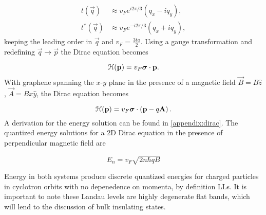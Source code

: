 \begin{align}
  t(\vec{q}) &\approx v_F e^{i 2\pi/3} \left(q_x - iq_y \right), \nonumber \\
  t^*(\vec{q}) &\approx v_F e^{-i 2\pi/3} \left(q_x + iq_y \right), \nonumber
\end{align}
keeping the leading order in $\vec{q}$ and $v_F = \tfrac{3ta}{2}$.
Using a gauge transformation and redefining $\vec{q} \rightarrow \vec{p}$ the Dirac equation becomes

\begin{equation}
  \mathcal{H}(\mathbf{p}) = v_F \bm{\sigma}\cdot \mathbf{p}.
\end{equation}
With graphene spanning the $x$-$y$ plane in the presence of a magnetic field $\vec{B} = B\hat{z}$, $\vec{A} =  Bx\hat{y}$, the Dirac equation becomes

\begin{equation}
  \mathcal{H}(\mathbf{p}) = v_F \bm{\sigma}\cdot \left(\mathbf{p} - q\mathbf{A} \right).
\end{equation}
A derivation for the energy solution can be found in \ref{appendix:dirac}.
The quantized energy solutions for a 2D Dirac equation in the presence of perpendicular magnetic field are

\begin{equation}
  E_n = v_F \sqrt{2 n \hbar qB }
\end{equation}

Energy in both systems produce discrete quantized energies for charged particles in cyclotron orbits with no depenedence on momenta, by definition LLs.
It is important to note these Landau levels are highly degenerate flat bands, which will lend to the discussion of bulk insulating states.

